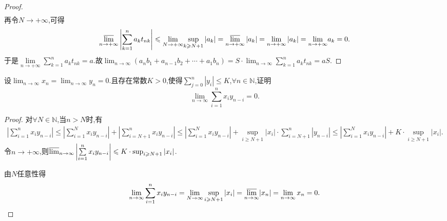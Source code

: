 \documentclass[../../main.tex]{subfiles}%
\begin{document}
\begin{proof}
\begin{align*}
\end{align*}
再令$N\to +\infty$,可得
\begin{align*}
\underset{n\rightarrow +\infty}{{\varlimsup }}\left| \sum\limits_{k=1}^n{a_kt_{nk}} \right|\leqslant \underset{N\rightarrow +\infty}{\lim}\underset{k\geqslant N+1}{\mathrm{sup}}\left| a_k \right|=\underset{n\rightarrow +\infty}{{\varlimsup }}\left| a_k \right|=\underset{n\rightarrow +\infty}{\lim}\left| a_k \right|=\underset{n\rightarrow +\infty}{\lim}a_k=0.
\end{align*}
于是$\underset{n\rightarrow +\infty}{\lim}\sum\limits_{k=1}^n{a_kt_{nk}}=a$.故$\lim_{n\rightarrow \infty} \left( a_nb_1+a_{n-1}b_2+\cdots +a_1b_n \right) =S\cdot \lim_{n\rightarrow \infty} \sum\limits_{k=1}^n{a_kt_{nk}}=aS$.

\end{proof}

\begin{example}
设$\lim_{n \to \infty} x_n = \lim_{n \to \infty} y_n = 0.$且存在常数\(K > 0\),使得\(\sum\limits_{j = 0}^{n} |y_i| \leqslant  K\),\(\forall n \in \mathbb{N}\),证明
\[
\lim_{n \to \infty} \sum\limits_{i = 1}^{n} x_i y_{n - i} = 0.
\]
\end{example}
\begin{proof}

对\(\forall N\in \mathbb{N}\),当\(n > N\)时,有
\begin{align*}
\left|\sum\limits_{i = 1}^{n} x_i y_{n - i}\right| \leqslant  \left|\sum\limits_{i = 1}^{N} x_i y_{n - i}\right| + \left|\sum\limits_{i = N + 1}^{n} x_i y_{n - i}\right|
\leqslant  \left|\sum\limits_{i = 1}^{N} x_i y_{n - i}\right| + \sup_{i\geqslant  N + 1} |x_i| \cdot \sum\limits_{i = N + 1}^{n} |y_{n - i}|
\leqslant  \left|\sum\limits_{i = 1}^{N} x_i y_{n - i}\right| + K \cdot \sup_{i\geqslant  N + 1} |x_i|.
\end{align*}
令$n\to+\infty$,则\(\varlimsup_{n \to \infty} \left|\sum\limits_{i = 1}^{n} x_i y_{n - i}\right| \leqslant  K \cdot \sup_{i\geqslant  N + 1} |x_i|\).

由\(N\)任意性得
\begin{align*}
\lim_{n\rightarrow \infty} \sum\limits_{i=1}^n{x_iy_{n-i}}=\lim_{N\rightarrow \infty} \mathop {\mathrm{sup}} \limits_{i\geqslant N+1}|x_i|=\underset{n\rightarrow \infty}{{\varlimsup }}|x_n|=\lim_{n\rightarrow \infty} x_n=0.
\end{align*}

\end{proof}
\end{document}
